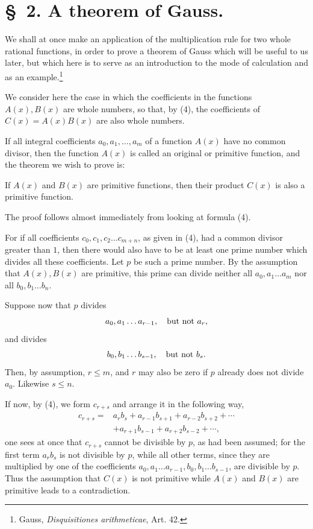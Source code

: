 \documentclass[11pt]{article}
\begin{document}
\section*{\S~2. A theorem of Gauss.}

We shall at once make an application of the multiplication rule for two whole rational functions, in order to prove a theorem of Gauss which will be useful to us later, but which here is to serve as an introduction to the mode of calculation and as an example.\footnote{Gauss, \emph{Disquisitiones arithmeticae}, Art. 42.}

We consider here the case in which the coefficients in the functions $A(x),B(x)$ are whole numbers, so that, by (4), the coefficients of $C(x)=A(x)B(x)$ are also whole numbers.

If all integral coefficients $a_0,a_1,\ldots,a_m$ of a function $A(x)$ have no common divisor, then the function $A(x)$ is called an original or primitive function, and the theorem we wish to prove is:

If $A(x)$ and $B(x)$ are primitive functions, then their product $C(x)$ is also a primitive function.

The proof follows almost immediately from looking at formula (4).

For if all coefficients $c_0,c_1,c_2\ldots c_{m+n}$, as given in (4), had a common divisor greater than $1$, then there would also have to be at least one prime number which divides all these coefficients. Let $p$ be such a prime number. By the assumption that $A(x),B(x)$ are primitive, this prime can divide neither all $a_0,a_1\ldots a_m$ nor all $b_0,b_1\ldots b_n$.

Suppose now that $p$ divides
\[
 a_0,a_1\ldots a_{r-1},\quad \hbox{but not }a_r,
\]
and divides
\[
 b_0,b_1\ldots b_{s-1},\quad \hbox{but not }b_s.
\]
Then, by assumption, $r\le m$, and $r$ may also be zero if $p$ already does not divide $a_0$. Likewise $s\le n$.

If now, by (4), we form $c_{r+s}$ and arrange it in the following way,
\begin{equation}
\begin{aligned}
 c_{r+s}={}&a_rb_s+a_{r-1}b_{s+1}+a_{r-2}b_{s+2}+\cdots\\
&+a_{r+1}b_{s-1}+a_{r+2}b_{s-2}+\cdots,
\end{aligned}
\tag{1}
\end{equation}
one sees at once that $c_{r+s}$ cannot be divisible by $p$, as had been assumed; for the first term $a_rb_s$ is not divisible by $p$, while all other terms, since they are multiplied by one of the coefficients $a_0,a_1\ldots a_{r-1},b_0,b_1\ldots b_{s-1}$, are divisible by $p$. Thus the assumption that $C(x)$ is not primitive while $A(x)$ and $B(x)$ are primitive leads to a contradiction.
\end{document}
